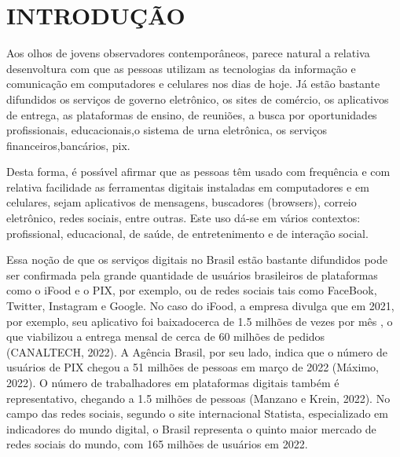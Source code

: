 \documentclass[
12pt,		%
openright,	%
twoside,  %
a4paper,			%
chapter=TITLE,		%
english,			%
french,				%
spanish,			%
brazil				%
]{USPSC-classe/USPSC}
\begin{document}
\chapter[INTRODU\c{C}\~AO]{INTRODU\c{C}\~AO}\label{INTRODU\c{C}\~AO}
Aos olhos de jovens observadores contempor\^aneos, parece natural a relativa desenvoltura com que as pessoas utilizam  as tecnologias da informa\c{c}\~ao e comunica\c{c}\~ao em computadores e celulares nos dias de hoje. J\'a est\~ao bastante difundidos os servi\c{c}os de governo eletr\^onico, os sites de com\'ercio, os  aplicativos de entrega, as plataformas de ensino, de reuni\~oes, a busca por oportunidades profissionais, educacionais,o sistema de urna eletr\^onica, os servi\c{c}os financeiros,banc\'arios, pix.










Desta forma, \'e poss\'{\i}vel afirmar que as pessoas t\^em usado com frequ\^encia e com relativa facilidade as ferramentas digitais instaladas em computadores e em celulares, sejam aplicativos de mensagens, buscadores (browsers), correio eletr\^onico, redes sociais, entre outras. Este uso d\'a-se em v\'arios contextos: profissional, educacional, de sa\'ude,  de entretenimento e de intera\c{c}\~ao social.










Essa no\c{c}\~ao de que os servi\c{c}os digitais no Brasil est\~ao bastante difundidos pode ser confirmada pela grande quantidade de usu\'arios brasileiros de plataformas como o iFood e o PIX, por exemplo, ou de redes sociais tais como FaceBook, Twitter, Instagram e Google. No caso do iFood, a empresa divulga que em 2021, por exemplo, seu aplicativo foi \textquotedbl baixado\textquotedbl  cerca de 1.5 milh\~oes de vezes por m\^es , o que viabilizou a entrega mensal de cerca de 60 milh\~oes de pedidos  (CANALTECH, 2022). A Ag\^encia Brasil, por seu lado, indica que o n\'umero de usu\'arios de PIX chegou a 51 milh\~oes de pessoas em mar\c{c}o de 2022  (M\'aximo, 2022). O n\'umero de trabalhadores em plataformas digitais tamb\'em \'e representativo, chegando a 1.5 milh\~oes de pessoas  (Manzano e Krein, 2022). No campo das redes sociais, segundo o site internacional Statista, especializado em indicadores do mundo digital, o Brasil representa o quinto maior mercado de redes sociais do mundo, com 165 milh\~oes de usu\'arios em 2022.
\end{document}

